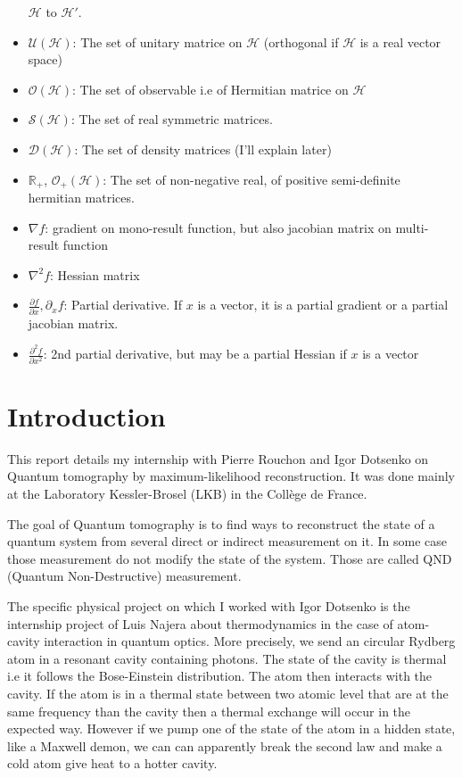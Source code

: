 \documentclass[10pt,a4paper]{report}
\theoremstyle{plain}
\theoremstyle{definition}
\theoremstyle{remark}
\newcommand{\R}{\ensuremath{\mathbb{R}}}
\newcommand{\dpar}[2]{\frac{\partial{#1}}{\partial{#2}}}
\newcommand{\dparn}[3]{\frac{\partial^{#3} {#1}}{\partial{#2}^{#3}}}
\begin{document}
\begin{itemize}
    $\mathcal{H}$ to $\mathcal{H}'$.
  \item $\mathcal{U}(\mathcal{H})$: The set of unitary matrice on $\mathcal{H}$
    (orthogonal if $\mathcal{H}$ is a real vector space)
  \item $\mathcal{O}(\mathcal{H})$: The set of observable i.e of Hermitian matrice on $\mathcal{H}$
  \item $\mathcal{S}(\mathcal{H})$: The set of real symmetric matrices.
  \item $\mathcal{D}(\mathcal{H})$: The set of density matrices (I'll explain later)
  \item $\R_+$, $\mathcal{O}_+(\mathcal{H})$: The set of non-negative real, of
    positive semi-definite hermitian matrices.
  \item $\nabla f$: gradient on mono-result function, but also jacobian matrix
    on multi-result function
  \item $\nabla^2 f$: Hessian matrix
  \item $\dpar f x, \partial_x f$: Partial derivative. If $x$ is a vector, it is
    a partial gradient or a partial jacobian matrix.
  \item $\dparn f x 2$: 2nd partial derivative, but may be a partial Hessian if
    $x$ is a vector
\end{itemize}



\chapter*{Introduction}

This report details my internship with Pierre Rouchon and Igor Dotsenko on
Quantum tomography by maximum-likelihood reconstruction. It was done mainly at
the Laboratory Kessler-Brosel (LKB) in the Collège de France.

The goal of Quantum tomography is to find ways to reconstruct the state of
a quantum system from several direct or indirect measurement on it. In some case
those measurement do not modify the state of the system. Those are called QND
(Quantum Non-Destructive) measurement.

The specific physical project on which I worked with Igor Dotsenko is the
internship project of Luis Najera about thermodynamics in the case of
atom-cavity interaction in quantum optics. More precisely, we send an circular
Rydberg atom in a resonant cavity containing photons. The state of the cavity is
thermal i.e it follows the Bose-Einstein distribution. The atom then interacts
with the cavity. If the atom is in a thermal state between two atomic level that
are at the same frequency than the cavity then a thermal exchange will occur in
the expected way. However if we pump one of the state of the atom in a hidden
state, like a Maxwell demon, we can can apparently break the second law and make
a cold atom give heat to a hotter cavity.
\end{document}
